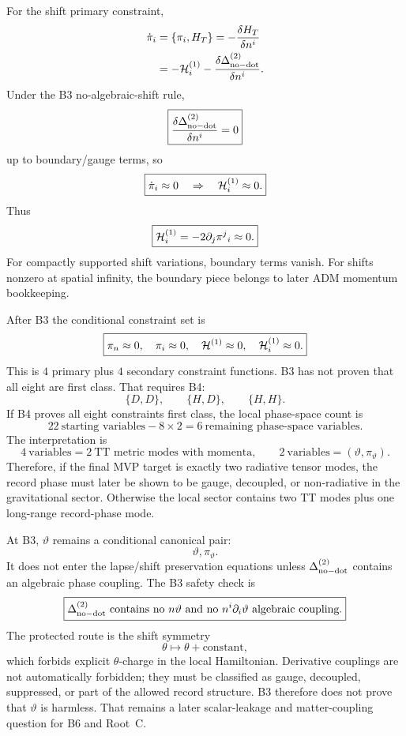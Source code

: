 \documentclass[11pt]{article}
\begin{document}
For the shift primary constraint,
\[
\begin{aligned}
\dot\pi_i
&=\{\pi_i,H_T\}
=-\frac{\delta H_T}{\delta n^i}\\
&=-{\cal H}_i^{(1)}
-\frac{\delta\Delta_{\rm no-dot}^{(2)}}{\delta n^i}.
\end{aligned}
\]
Under the B3 no-algebraic-shift rule,
\[
\boxed{\frac{\delta\Delta_{\rm no-dot}^{(2)}}{\delta n^i}=0}
\]
up to boundary/gauge terms, so
\[
\boxed{\dot\pi_i\approx0\quad\Rightarrow\quad
{\cal H}_i^{(1)}\approx0.}
\]
Thus
\[
\boxed{{\cal H}_i^{(1)}=-2\partial_j\pi^j{}_i\approx0.}
\]
For compactly supported shift variations, boundary terms vanish.  For shifts
nonzero at spatial infinity, the boundary piece belongs to later ADM momentum
bookkeeping.

After B3 the conditional constraint set is
\[
\boxed{
\pi_n\approx0,\quad \pi_i\approx0,\quad
{\cal H}^{(1)}\approx0,\quad {\cal H}_i^{(1)}\approx0.
}
\]
This is \(4\) primary plus \(4\) secondary constraint functions.  B3 has not
proven that all eight are first class.  That requires B4:
\[
\boxed{\{D,D\},\qquad \{H,D\},\qquad \{H,H\}.}
\]
If B4 proves all eight constraints first class, the local phase-space count is
\[
\boxed{
22\ \text{starting variables}
-8\times2
=6\ \text{remaining phase-space variables}.
}
\]
The interpretation is
\[
\boxed{
4\ \text{variables}=2\ \text{TT metric modes with momenta},\qquad
2\ \text{variables}=(\vartheta,\pi_\vartheta).
}
\]
Therefore, if the final MVP target is exactly two radiative tensor modes, the
record phase must later be shown to be gauge, decoupled, or non-radiative in
the gravitational sector.  Otherwise the local sector contains two TT modes
plus one long-range record-phase mode.

At B3, \(\vartheta\) remains a conditional canonical pair:
\[
\boxed{\vartheta,\pi_\vartheta.}
\]
It does not enter the lapse/shift preservation equations unless
\(\Delta_{\rm no-dot}^{(2)}\) contains an algebraic phase coupling.  The B3
safety check is
\[
\boxed{
\Delta_{\rm no-dot}^{(2)}\ \text{contains no}\ n\vartheta
\ \text{and no}\ n^i\partial_i\vartheta\ \text{algebraic coupling}.
}
\]
The protected route is the shift symmetry
\[
\boxed{\theta\mapsto\theta+\text{constant},}
\]
which forbids explicit \(\theta\)-charge in the local Hamiltonian.  Derivative
couplings are not automatically forbidden; they must be classified as gauge,
decoupled, suppressed, or part of the allowed record structure.  B3 therefore
does not prove that \(\vartheta\) is harmless.  That remains a later
scalar-leakage and matter-coupling question for B6 and Root~C.
\end{document}

